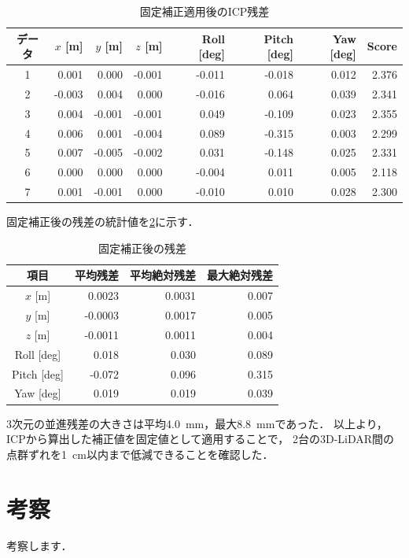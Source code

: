 \begin{table}[tb]
    \centering
    \caption{固定補正適用後のICP残差}
    \label{tab:icp_residual}
    \begin{tabular}{c|rrr|rrr|r}
        \hline
        データ & $x$ [m] & $y$ [m] & $z$ [m] & Roll [deg] & Pitch [deg] & Yaw [deg] & Score \\
        \hline
        1 &  0.001 &  0.000 & -0.001 & -0.011 & -0.018 & 0.012 & 2.376 \\
        2 & -0.003 &  0.004 &  0.000 & -0.016 &  0.064 & 0.039 & 2.341 \\
        3 &  0.004 & -0.001 & -0.001 &  0.049 & -0.109 & 0.023 & 2.355 \\
        4 &  0.006 &  0.001 & -0.004 &  0.089 & -0.315 & 0.003 & 2.299 \\
        5 &  0.007 & -0.005 & -0.002 &  0.031 & -0.148 & 0.025 & 2.331 \\
        6 &  0.000 &  0.000 &  0.000 & -0.004 &  0.011 & 0.005 & 2.118 \\
        7 &  0.001 & -0.001 &  0.000 & -0.010 &  0.010 & 0.028 & 2.300 \\
        \hline
    \end{tabular}
\end{table}

固定補正後の残差の統計値を\cref{tab:icp_residual_stats}に示す．

\begin{table}[tb]
    \centering
    \caption{固定補正後の残差}
    \label{tab:icp_residual_stats}
    \begin{tabular}{c|rrr}
        \hline
        項目 & 平均残差 & 平均絶対残差 & 最大絶対残差 \\
        \hline
        $x$ [m]       &  0.0023 & 0.0031 & 0.007 \\
        $y$ [m]       & -0.0003 & 0.0017 & 0.005 \\
        $z$ [m]       & -0.0011 & 0.0011 & 0.004 \\
        Roll [deg]    &  0.018  & 0.030  & 0.089 \\
        Pitch [deg]   & -0.072  & 0.096  & 0.315 \\
        Yaw [deg]     &  0.019  & 0.019  & 0.039 \\
        \hline
    \end{tabular}
\end{table}

3次元の並進残差の大きさは平均4.0~mm，最大8.8~mmであった．
以上より，ICPから算出した補正値を固定値として適用することで，
2台の3D-LiDAR間の点群ずれを1~cm以内まで低減できることを確認した．
\section{考察}
\label{sec:exp_discussion}



考察します．